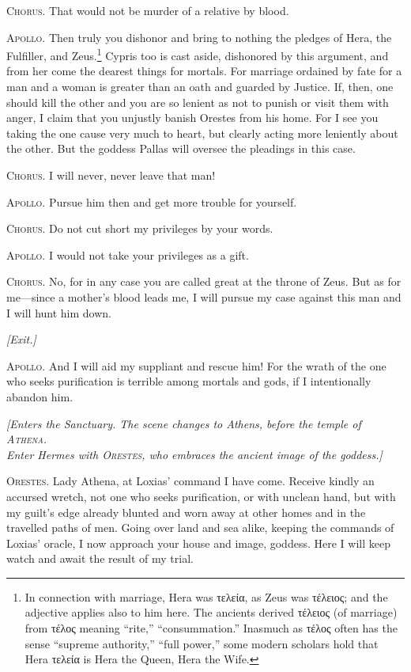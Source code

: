 \documentclass[12pt]{article}
\begin{document}
\textsc{Chorus.} That would not be murder of a relative by blood.

\textsc{Apollo.} Then truly you dishonor and bring to nothing the pledges of Hera, the Fulfiller, and Zeus.\footnote{In connection with marriage, Hera was τελεία, as Zeus was τέλειος; and the adjective applies also to him here. The ancients derived τέλειος (of marriage) from τέλος meaning ``rite,'' ``consummation.'' Inasmuch as τέλος often has the sense ``supreme authority,'' ``full power,'' some modern scholars hold that Hera τελεία is Hera the Queen, Hera the Wife.} Cypris too is cast aside, dishonored by this argument, and from her come the dearest things for mortals. For marriage ordained by fate for a man and a woman is greater than an oath and guarded by Justice. If, then, one should kill the other and you are so lenient as not to punish or visit them with anger, I claim that you unjustly banish Orestes from his home. For I see you taking the one cause very much to heart, but clearly acting more leniently about the other. But the goddess Pallas will oversee the pleadings in this case.

\textsc{Chorus.} I will never, never leave that man!

\textsc{Apollo.} Pursue him then and get more trouble for yourself.

\textsc{Chorus.} Do not cut short my privileges by your words.

\textsc{Apollo.} I would not take your privileges as a gift.

\textsc{Chorus.} No, for in any case you are called great at the throne of Zeus. But as for me---since a mother's blood leads me, I will pursue my case against this man and I will hunt him down.

\begin{center}
\textit{[Exit.]}
\end{center}

\textsc{Apollo.} And I will aid my suppliant and rescue him! For the wrath of the one who seeks purification is terrible among mortals and gods, if I intentionally abandon him.

\begin{center}
\textit{[Enters the Sanctuary. The scene changes to Athens, before the temple of \textsc{Athena}.\\
Enter Hermes with \textsc{Orestes}, who embraces the ancient image of the goddess.]}
\end{center}

\textsc{Orestes.} Lady Athena, at Loxias' command I have come. Receive kindly an accursed wretch, not one who seeks purification, or with unclean hand, but with my guilt's edge already blunted and worn away at other homes and in the travelled paths of men. Going over land and sea alike, keeping the commands of Loxias' oracle, I now approach your house and image, goddess. Here I will keep watch and await the result of my trial.
\end{document}
